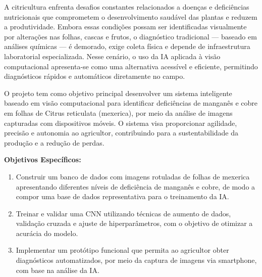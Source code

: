 A citricultura enfrenta desafios constantes relacionados a doenças e deficiências nutricionais que comprometem o desenvolvimento saudável das plantas e reduzem a produtividade. Embora essas condições possam ser identificadas visualmente por alterações nas folhas, cascas e frutos, o diagnóstico tradicional — baseado em análises químicas — é demorado, exige coleta física e depende de infraestrutura laboratorial especializada. Nesse cenário, o uso da IA aplicada à visão computacional apresenta-se como uma alternativa acessível e eficiente, permitindo diagnósticos rápidos e automáticos diretamente no campo.

O projeto tem como objetivo principal desenvolver um sistema inteligente baseado em visão computacional para identificar deficiências de manganês e cobre em folhas de Citrus reticulata (mexerica), por meio da análise de imagens capturadas com dispositivos móveis. O sistema visa proporcionar agilidade, precisão e autonomia ao agricultor, contribuindo para a sustentabilidade da produção e a redução de perdas.

\textbf{Objetivos Específicos:}
\begin{enumerate}
\item Construir um banco de dados com imagens rotuladas de folhas de mexerica apresentando diferentes níveis de deficiência de manganês e cobre, de modo a compor uma base de dados representativa para o treinamento da IA.
\item Treinar e validar uma CNN utilizando técnicas de aumento de dados, validação cruzada e ajuste de hiperparâmetros, com o objetivo de otimizar a acurácia do modelo.
\item Implementar um protótipo funcional que permita ao agricultor obter diagnósticos automatizados, por meio da captura de imagens via smartphone, com base na análise da IA.
\end{enumerate}

